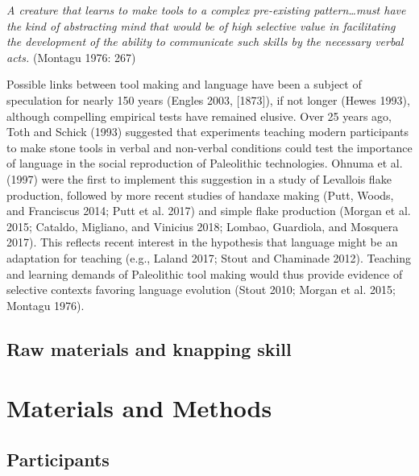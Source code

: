 \documentclass[smallextended]{svjour3}       %
\begin{document}
\emph{A creature that learns to make tools to a complex pre-existing
pattern\ldots must have the kind of abstracting mind that would be of
high selective value in facilitating the development of the ability to
communicate such skills by the necessary verbal acts.} (Montagu 1976:
267)

Possible links between tool making and language have been a subject of
speculation for nearly 150 years (Engles 2003, {[}1873{]}), if not
longer (Hewes 1993), although compelling empirical tests have remained
elusive. Over 25 years ago, Toth and Schick (1993) suggested that
experiments teaching modern participants to make stone tools in verbal
and non-verbal conditions could test the importance of language in the
social reproduction of Paleolithic technologies. Ohnuma et al. (1997)
were the first to implement this suggestion in a study of Levallois
flake production, followed by more recent studies of handaxe making
(Putt, Woods, and Franciscus 2014; Putt et al. 2017) and simple flake
production (Morgan et al. 2015; Cataldo, Migliano, and Vinicius 2018;
Lombao, Guardiola, and Mosquera 2017). This reflects recent interest in
the hypothesis that language might be an adaptation for teaching (e.g.,
Laland 2017; Stout and Chaminade 2012). Teaching and learning demands of
Paleolithic tool making would thus provide evidence of selective
contexts favoring language evolution (Stout 2010; Morgan et al. 2015;
Montagu 1976).

\hfill\break

\hypertarget{raw-materials-and-knapping-skill}{%
\subsection{\texorpdfstring{\textbf{Raw materials and knapping
skill}}{Raw materials and knapping skill}}\label{raw-materials-and-knapping-skill}}

\hypertarget{materials-and-methods}{%
\section{\texorpdfstring{\textbf{Materials and
Methods}}{Materials and Methods}}\label{materials-and-methods}}

\hypertarget{participants}{%
\subsection{\texorpdfstring{\textbf{Participants}}{Participants}}\label{participants}}
\end{document}

